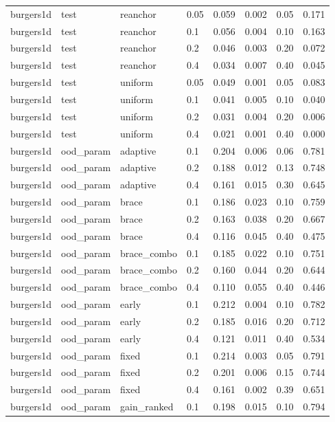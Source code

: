 \begin{longtable}{llllrrrr}
burgers1d & test & reanchor & 0.05 & 0.059 & 0.002 & 0.05 & 0.171 \\
burgers1d & test & reanchor & 0.1 & 0.056 & 0.004 & 0.10 & 0.163 \\
burgers1d & test & reanchor & 0.2 & 0.046 & 0.003 & 0.20 & 0.072 \\
burgers1d & test & reanchor & 0.4 & 0.034 & 0.007 & 0.40 & 0.045 \\
burgers1d & test & uniform & 0.05 & 0.049 & 0.001 & 0.05 & 0.083 \\
burgers1d & test & uniform & 0.1 & 0.041 & 0.005 & 0.10 & 0.040 \\
burgers1d & test & uniform & 0.2 & 0.031 & 0.004 & 0.20 & 0.006 \\
burgers1d & test & uniform & 0.4 & 0.021 & 0.001 & 0.40 & 0.000 \\
\midrule
burgers1d & ood\_param & adaptive & 0.1 & 0.204 & 0.006 & 0.06 & 0.781 \\
burgers1d & ood\_param & adaptive & 0.2 & 0.188 & 0.012 & 0.13 & 0.748 \\
burgers1d & ood\_param & adaptive & 0.4 & 0.161 & 0.015 & 0.30 & 0.645 \\
burgers1d & ood\_param & brace & 0.1 & 0.186 & 0.023 & 0.10 & 0.759 \\
burgers1d & ood\_param & brace & 0.2 & 0.163 & 0.038 & 0.20 & 0.667 \\
burgers1d & ood\_param & brace & 0.4 & 0.116 & 0.045 & 0.40 & 0.475 \\
burgers1d & ood\_param & brace\_combo & 0.1 & 0.185 & 0.022 & 0.10 & 0.751 \\
burgers1d & ood\_param & brace\_combo & 0.2 & 0.160 & 0.044 & 0.20 & 0.644 \\
burgers1d & ood\_param & brace\_combo & 0.4 & 0.110 & 0.055 & 0.40 & 0.446 \\
burgers1d & ood\_param & early & 0.1 & 0.212 & 0.004 & 0.10 & 0.782 \\
burgers1d & ood\_param & early & 0.2 & 0.185 & 0.016 & 0.20 & 0.712 \\
burgers1d & ood\_param & early & 0.4 & 0.121 & 0.011 & 0.40 & 0.534 \\
burgers1d & ood\_param & fixed & 0.1 & 0.214 & 0.003 & 0.05 & 0.791 \\
burgers1d & ood\_param & fixed & 0.2 & 0.201 & 0.006 & 0.15 & 0.744 \\
burgers1d & ood\_param & fixed & 0.4 & 0.161 & 0.002 & 0.39 & 0.651 \\
burgers1d & ood\_param & gain\_ranked & 0.1 & 0.198 & 0.015 & 0.10 & 0.794 \\

\end{longtable}
